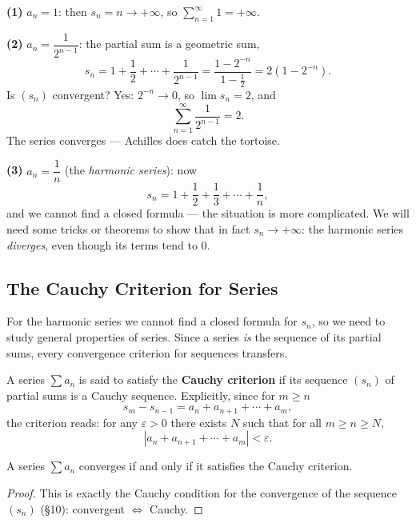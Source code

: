 \documentclass[11pt]{report}
\begin{document}
\begin{exbox}
\textbf{(1)} $a_n = 1$: then $s_n = n \to +\infty$, so $\sum_{n=1}^\infty 1 = +\infty$.

\textbf{(2)} $a_n = \dfrac{1}{2^{n-1}}$: the partial sum is a geometric sum,
\[
s_n = 1 + \frac12 + \cdots + \frac{1}{2^{n-1}} = \frac{1 - 2^{-n}}{1 - \tfrac12} = 2\left(1 - 2^{-n}\right).
\]
Is $(s_n)$ convergent? Yes: $2^{-n} \to 0$, so $\lim s_n = 2$, and
\[
\sum_{n=1}^\infty \frac{1}{2^{n-1}} = 2.
\]
The series converges --- Achilles does catch the tortoise.

\textbf{(3)} $a_n = \dfrac1n$ (the \emph{harmonic series}): now
\[
s_n = 1 + \frac12 + \frac13 + \cdots + \frac1n,
\]
and we cannot find a closed formula --- the situation is more complicated. We will need some tricks or theorems to show that in fact $s_n \to +\infty$: the harmonic series \emph{diverges}, even though its terms tend to $0$.
\end{exbox}

\subsection{The Cauchy Criterion for Series}

For the harmonic series we cannot find a closed formula for $s_n$, so we need to study general properties of series. Since a series \emph{is} the sequence of its partial sums, every convergence criterion for sequences transfers.

\begin{defbox}
A series $\sum a_n$ is said to satisfy the \textbf{Cauchy criterion} if its sequence $(s_n)$ of partial sums is a Cauchy sequence. Explicitly, since for $m \geq n$
\[
s_m - s_{n-1} = a_n + a_{n+1} + \cdots + a_m,
\]
the criterion reads: for any $\varepsilon > 0$ there exists $N$ such that for all $m \geq n \geq N$,
\[
|a_n + a_{n+1} + \cdots + a_m| < \varepsilon.
\]
\end{defbox}

\begin{thmbox}
A series $\sum a_n$ converges if and only if it satisfies the Cauchy criterion.
\end{thmbox}

\begin{proof}
This is exactly the Cauchy condition for the convergence of the sequence $(s_n)$ (\S 10): convergent $\iff$ Cauchy.
\end{proof}
\end{document}
